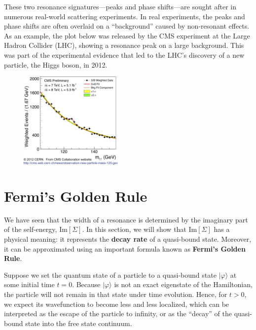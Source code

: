 \documentclass[pra,12pt]{revtex4}
\begin{document}
These two resonance signatures---peaks and phase shifts---are sought
after in numerous real-world scattering experiments.  In real
experiments, the peaks and phase shifts are often overlaid on a
``background'' caused by non-resonant effects.  As an example, the
plot below was released by the CMS experiment at the Large Hadron
Collider (LHC), showing a resonance peak on a large background.  This
was part of the experimental evidence that led to the LHC's discovery
of a new particle, the Higgs boson, in 2012.

\begin{figure}[h]
  \centering\includegraphics[width=0.45\textwidth]{higgs}
\end{figure}

\section{Fermi's Golden Rule}

We have seen that the width of a resonance is determined by the
imaginary part of the self-energy, $\mathrm{Im}[\Sigma]$.  In this
section, we will show that $\mathrm{Im}[\Sigma]$ has a physical
meaning: it represents the \textbf{decay rate} of a quasi-bound state.
Moreover, it can be approximated using an important formula known as
\textbf{Fermi's Golden Rule}.

Suppose we set the quantum state of a particle to a quasi-bound state
$|\varphi\rangle$ at some initial time $t = 0$.  Because
$|\varphi\rangle$ is not an exact eigenstate of the Hamiltonian, the
particle will not remain in that state under time evolution.  Hence,
for $t > 0$, we expect its wavefunction to become less and less
localized, which can be interpreted as the escape of the particle to
infinity, or as the ``decay'' of the quasi-bound state into the free
state continuum.
\end{document}
